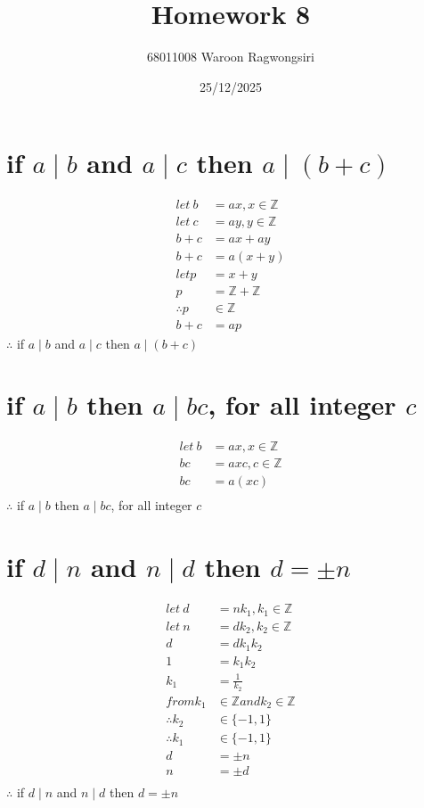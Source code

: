 \documentclass{article}
\title{Homework 8}
\author{68011008 Waroon Ragwongsiri}
\date{25/12/2025}
\begin{document}
\maketitle

{\small
\section{if $a \mid b$ and $a \mid c$ then $a \mid (b+c)$}
}
\begin{align}
	let \ b &= ax, x \in \mathbb{Z} \\
	let \ c &= ay, y \in \mathbb{Z} \\
	b + c &= ax + ay \\
	b + c &= a(x + y) \\
	let p &= x + y \\
	p &= \mathbb{Z} + \mathbb{Z} \\
	\therefore p &\in \mathbb{Z} \\
	b + c &= ap
\end{align}
\subitem
$\therefore$ if $a \mid b$ and $a \mid c$ then $a \mid (b+c)$

{\small
\section{if $a \mid b$ then $a \mid bc$, for all integer $c$}
}
\begin{align}
	let \ b &= ax, x \in \mathbb{Z} \\
	bc &= axc, c \in \mathbb{Z} \\
	bc &= a(xc) \\
\end{align}
\subitem
$\therefore$ if $a \mid b$ then $a \mid bc$, for all integer $c$

{\small
\section{if $d \mid n$ and $n \mid d$ then $d = \pm n$}
}
\begin{align}
	let \ d &= n k_1, k_1 \in \mathbb{Z} \\
	let \ n &= d k_2, k_2 \in \mathbb{Z} \\
	d &= d k_1 k_2 \\
	1 &= k_1 k_2 \\
	k_1 &=\frac{1}{k_2} \\
	from k_1 &\in \mathbb{Z} and k_2 \in \mathbb{Z} \\
	\therefore k_2 &\in \{ -1, 1 \} \\
	\therefore k_1 &\in \{ -1, 1 \} \\
	d &= \pm n \\
	n &= \pm d \\
\end{align}
\subitem
$\therefore$ if $d \mid n$ and $n \mid d$ then $d = \pm n$
\end{document}
